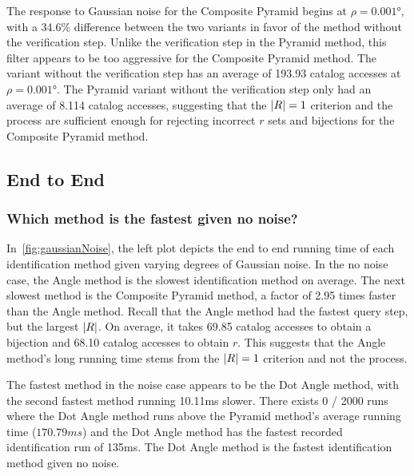 The response to Gaussian noise for the Composite Pyramid begins at $\rho=\ang{0.001}$, with a 34.6\% difference
between the two variants in favor of the method without the verification step.
Unlike the verification step in the Pyramid method, this filter appears to be too aggressive for the Composite Pyramid
method.
The variant without the verification step has an average of 193.93 catalog accesses at $\rho=\ang{0.001}$.
The Pyramid variant without the verification step only had an average of 8.114 catalog accesses, suggesting that the
$\left| R \right| = 1$ criterion and the  process are sufficient enough for rejecting incorrect $r$ sets and
bijections for the Composite Pyramid method.

\subsection{End to End}\label{subsec:endToEndEvaluation}
\subsubsection{Which method is the fastest given no noise?}
In~\autoref{fig:gaussianNoise}, the left plot depicts the end to end running time of each identification method given
varying degrees of Gaussian noise.
In the no noise case, the Angle method is the slowest identification method on average.
The next slowest method is the Composite Pyramid method, a factor of 2.95 times faster than the Angle method.
Recall that the Angle method had the fastest query step, but the largest $\left| R \right|$.
On average, it takes 69.85 catalog accesses to obtain a bijection and 68.10 catalog accesses to obtain $r$.
This suggests that the Angle method's long running time stems from the $\left| R \right| = 1$ criterion and not the 
process.

The fastest method in the noise case appears to be the Dot Angle method, with the second fastest method running
10.11\si{ms} slower.
There exists 0 / 2000 runs where the Dot Angle method runs above the Pyramid method's average running time
($170.79\si{ms}$) and the Dot Angle method has the fastest recorded identification run of 135ms.
The Dot Angle method is the fastest identification method given no noise.

